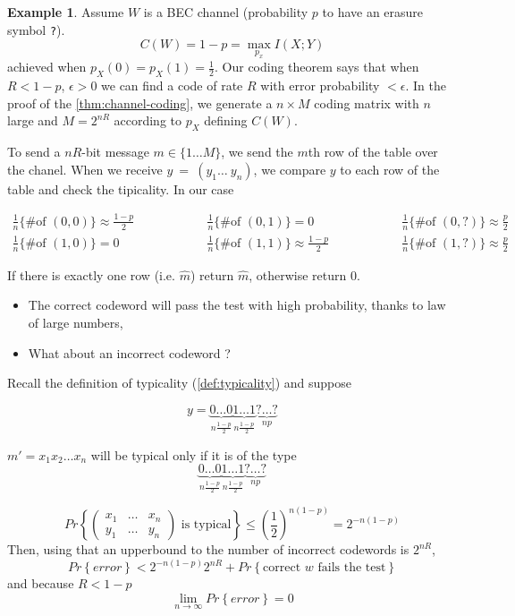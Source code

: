 \documentclass[twoside]{article}
\theoremstyle{definition} %
\newtheorem{example}{Example}
\renewcommand{\Pr}[1]{Pr\left\{#1\right\}}
\newcommand{\pfrac}[2]{\left( \frac{#1}{#2} \right)}
\begin{document}
\begin{example}
  Assume $W$ is a BEC channel (probability $p$ to have an erasure symbol \texttt{?}).
  \[
    C(W) = 1-p = \max_{p_x} I(X;Y)
  \]
  achieved when $p_X(0)=p_X(1)=\frac 1 2$. Our coding theorem says that when $R<1-p$, $\epsilon > 0$ we can find a code of rate $R$ with error probability $< \epsilon$. In the proof of the \cref{thm:channel-coding}, we generate a $n\times M$ coding matrix with $n$ large and $M=2^{nR}$ according to $p_X$ defining $C(W)$.

  To send a $nR$-bit message $m \in \{1 \dots M\}$, we send the $m$th row of the table over the chanel. When we receive $y~=~(y_1\dots~y_n)$, we compare $y$ to each row of the table and check the tipicality. In our case

  \begin{align*}
    \frac 1 n \{\text{\# of }(0,0)\} \approx \frac {1-p} 2 \hspace{5em}&
    \frac 1 n \{\text{\# of }(0,1)\} = 0 \hspace{5em}&
    \frac 1 n \{\text{\# of }(0,?)\} \approx \frac p 2 \\
    \frac 1 n \{\text{\# of }(1,0)\} = 0 \hspace{5em}&
    \frac 1 n \{\text{\# of }(1,1)\} \approx \frac {1-p} 2 \hspace{5em}&
    \frac 1 n \{\text{\# of }(1,?)\} \approx \frac p 2
  \end{align*}

  If there is exactly one row (i.e. $\hat m$) return $\hat m$, otherwise return $0$.

  \begin{itemize}
    \item The correct codeword will pass the test with high probability, thanks to law of large numbers,
    \item What about an incorrect codeword ?
  \end{itemize}

  Recall the definition of typicality (\cref{def:typicality}) and suppose

  \[
    y = \underbrace{0\dots0}_{n \frac{1-p} 2} \underbrace{1\dots1}_{n \frac{1-p} 2} \underbrace{?\dots?}_{np}
  \]

  $m' = x_1 x_2 \dots x_n$ will be typical only if it is of the type
  \[
    \underbrace{0\dots0}_{n \frac{1-p} 2} \underbrace{1\dots1}_{n \frac{1-p} 2} \underbrace{?\dots?}_{np}
  \]

  \[
    \Pr{
    \begin{pmatrix}
      x_1 & \dots & x_n\\
      y_1 & \dots & y_n
    \end{pmatrix}
    \text{ is typical}
    }
    \leq
    \pfrac 1 2 ^ {n(1-p)} = 2^{-n(1-p)}
  \]
  Then, using that an upperbound to the number of incorrect codewords is $2^{nR}$,
  \[
    \Pr{error} < 2^{-n(1-p)}2^{nR} + \Pr{\text{correct $w$ fails the test}}
  \]
  and because $R < 1-p$
  \[
    \lim_{n\to \infty} \Pr{error} = 0
  \]

\end{example}
\end{document}
